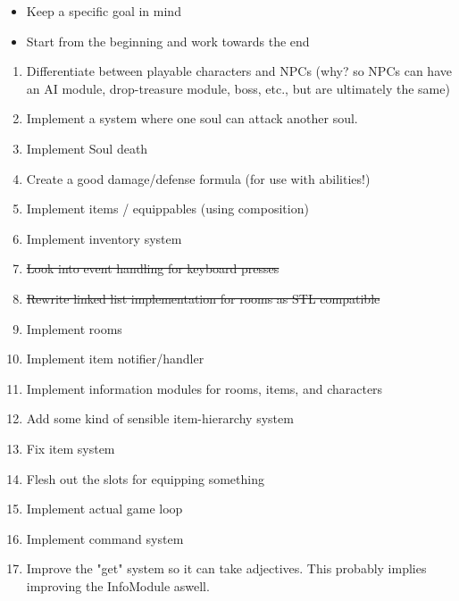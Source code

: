 \documentclass{article}
\begin{document}
\begin{itemize}
    \item Keep a specific goal in mind 
    \item Start from the beginning and work towards the end
\end{itemize}

\hline

\begin{enumerate}
    \item Differentiate between playable characters and NPCs (why?
        so NPCs can have an AI module, drop-treasure module, boss,
        etc., but are ultimately the same)
    \item Implement a system where one soul can attack another soul. \checkmark
    \item Implement Soul death
    \item Create a good damage/defense formula (for use with abilities!)
    \item Implement items / equippables (using composition) \checkmark
    \item Implement inventory system \checkmark
    \item \sout{Look into event handling for keyboard presses}
    \item \sout{Rewrite linked list implementation for rooms as STL compatible}
    \item Implement rooms \checkmark
    \item Implement item notifier/handler \checkmark
    \item Implement information modules for rooms, items, and characters \checkmark
    \item Add some kind of sensible item-hierarchy system \checkmark
    \item Fix item system \checkmark
    \item Flesh out the slots for equipping something
    \item Implement actual game loop
    \item Implement command system
    \item Improve the "get" system so it can take adjectives. This 
        probably implies improving the InfoModule aswell.
\end{enumerate}
\end{document}
